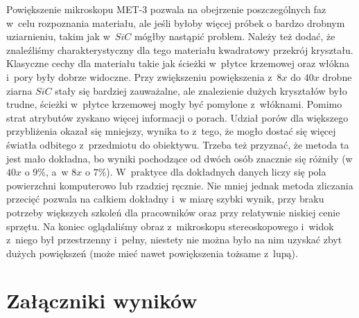 Powiększenie mikroskopu MET-3 pozwala na obejrzenie poszczególnych faz w~celu rozpoznania materiału, ale jeśli byłoby więcej próbek o bardzo drobnym uziarnieniu, takim jak w~$SiC$ mógłby nastąpić problem. Należy też dodać, że znaleźliśmy charakterystyczny dla tego materiału kwadratowy przekrój kryształu. Klasyczne cechy dla materiału takie jak ścieżki w~płytce krzemowej oraz włókna i~pory były dobrze widoczne. Przy zwiększeniu powiększenia z~$8x$ do $40x$ drobne ziarna $SiC$ stały się bardziej zauważalne, ale znalezienie dużych kryształów było trudne, ścieżki w~płytce krzemowej mogły być pomylone z~włóknami. Pomimo strat atrybutów zyskano więcej informacji o porach. Udział porów dla większego przybliżenia okazał się mniejszy, wynika to z~tego, że mogło dostać się więcej światła odbitego z~przedmiotu do obiektywu. Trzeba też przyznać, że metoda ta jest mało dokładna, bo wyniki pochodzące od dwóch osób znacznie się różniły (w $40x$ o $9\%$, a~w $8x$ o $7\%$). W~praktyce dla dokładnych danych liczy się pola powierzchni komputerowo lub rzadziej ręcznie. Nie mniej jednak metoda zliczania przecięć pozwala na całkiem dokładny i~w miarę szybki wynik, przy braku potrzeby większych szkoleń dla pracowników oraz przy relatywnie niskiej cenie sprzętu. Na koniec oglądaliśmy obraz z~mikroskopu stereoskopowego i~widok z~niego był przestrzenny i~pełny, niestety nie można było na nim uzyskać zbyt dużych powiększeń (może mieć nawet powiększenia tożsame z~lupą).

\section{Załączniki wyników}

